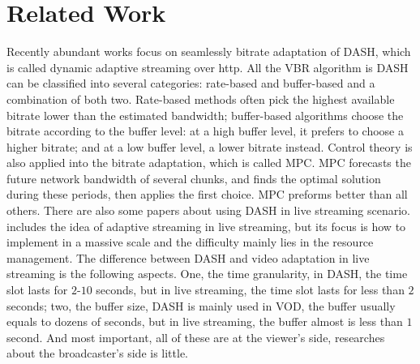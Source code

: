 \section{Related Work}
Recently abundant works focus on seamlessly bitrate adaptation of DASH, which is called dynamic adaptive streaming over http. All the VBR algorithm is DASH can be classified into several categories: rate-based and buffer-based and a combination of both two. Rate-based methods often pick the highest available bitrate lower than the estimated bandwidth; buffer-based algorithms choose the bitrate according to the buffer level: at a high buffer level, it prefers to choose a higher bitrate; and at a low buffer level, a lower bitrate instead. Control theory is also applied into the bitrate adaptation, which is called MPC. MPC forecasts the future network bandwidth of several chunks, and finds the optimal solution during these periods, then applies the first choice. MPC preforms better than all others.
There are also some papers about using DASH in live streaming scenario. \cite{pires2014dash} includes the idea of adaptive streaming in live streaming, but its focus is how to implement in a massive scale and the difficulty mainly lies in the resource management.
The difference between DASH and video adaptation in live streaming is the following aspects. One, the time granularity, in DASH, the time slot lasts for $2$-$10$ seconds, but in live streaming, the time slot lasts for less than $2$ seconds; two, the buffer size, DASH is mainly used in VOD, the buffer usually equals to dozens of seconds, but in live streaming, the buffer almost is less than $1$ second. And most important, all of these are at the viewer's side, researches about the broadcaster's side is little. 